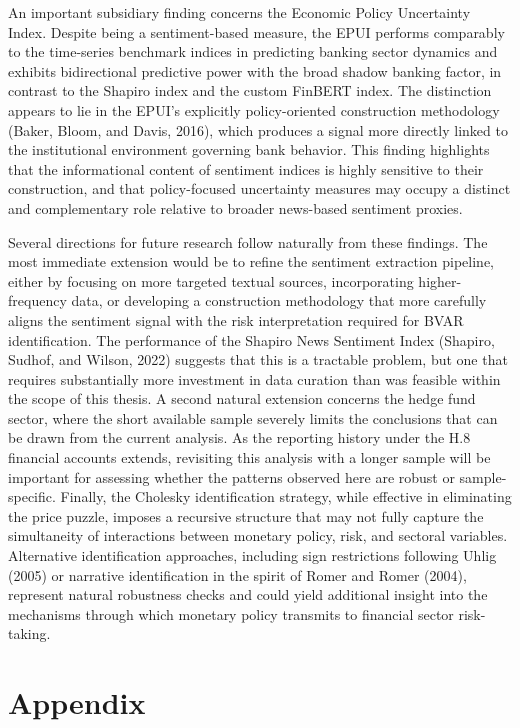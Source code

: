 \documentclass[12pt,a4paper]{report}\usepackage[a4paper, top=2.5cm, bottom=2.5cm, left=2.5cm, right=2.5cm]{geometry}
\begin{document}
An important subsidiary finding concerns the Economic Policy Uncertainty Index.
Despite being a sentiment-based measure, the EPUI performs comparably to the
time-series benchmark indices in predicting banking sector dynamics and exhibits
bidirectional predictive power with the broad shadow banking factor, in contrast
to the Shapiro index and the custom FinBERT index. The distinction appears to lie
in the EPUI's explicitly policy-oriented construction methodology (Baker, Bloom,
and Davis, 2016), which produces a signal more directly linked to the institutional
environment governing bank behavior. This finding highlights that the informational
content of sentiment indices is highly sensitive to their construction, and that
policy-focused uncertainty measures may occupy a distinct and complementary role
relative to broader news-based sentiment proxies.

Several directions for future research follow naturally from these findings. The
most immediate extension would be to refine the sentiment extraction pipeline,
either by focusing on more targeted textual sources, incorporating higher-frequency
data, or developing a construction methodology that more carefully aligns the
sentiment signal with the risk interpretation required for BVAR identification.
The performance of the Shapiro News Sentiment Index (Shapiro, Sudhof, and Wilson,
2022) suggests that this is a tractable problem, but one that requires substantially
more investment in data curation than was feasible within the scope of this thesis.
A second natural extension concerns the hedge fund sector, where the short available
sample severely limits the conclusions that can be drawn from the current analysis.
As the reporting history under the H.8 financial accounts extends, revisiting this
analysis with a longer sample will be important for assessing whether the patterns
observed here are robust or sample-specific. Finally, the Cholesky identification
strategy, while effective in eliminating the price puzzle, imposes a recursive
structure that may not fully capture the simultaneity of interactions between
monetary policy, risk, and sectoral variables. Alternative identification approaches,
including sign restrictions following Uhlig (2005) or narrative identification in
the spirit of Romer and Romer (2004), represent natural robustness checks and
could yield additional insight into the mechanisms through which monetary policy
transmits to financial sector risk-taking.


\chapter{Appendix}
\end{document}

